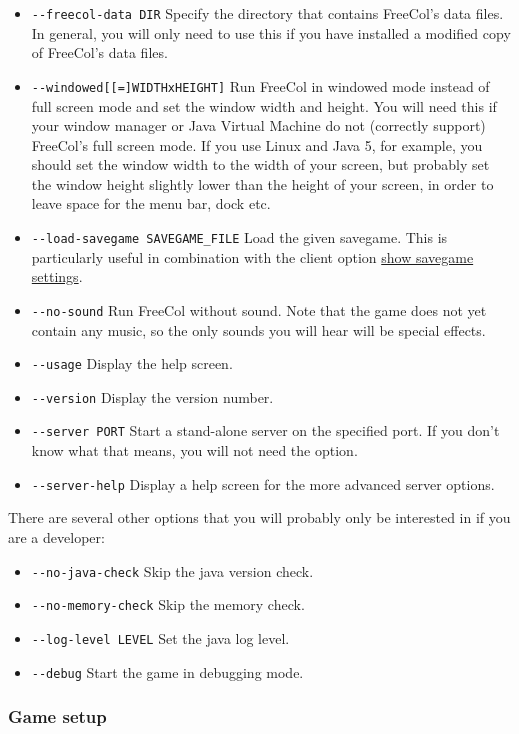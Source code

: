 \documentclass[12pt]{article}
\begin{document}
\begin{itemize}
\item\verb$--freecol-data DIR$ Specify the directory that contains
FreeCol's data files. In general, you will only need to use this if
you have installed a modified copy of FreeCol's data files.
\item\verb$--windowed[[=]WIDTHxHEIGHT]$ Run FreeCol in windowed mode
instead of full screen mode and set the window width and height. You
will need this if your window manager or Java Virtual Machine do not
(correctly support) FreeCol's full screen mode. If you use Linux and
Java 5, for example, you should set the window width to the width of
your screen, but probably set the window height slightly lower than
the height of your screen, in order to leave space for the menu bar,
dock etc.
\item\verb$--load-savegame SAVEGAME_FILE$ Load the given
savegame. This is particularly useful in combination with the client
option \hyperlink{show savegame settings}{show savegame settings}.
\item\verb$--no-sound$ Run FreeCol without sound. Note that the game
does not yet contain any music, so the only sounds you will hear will
be special effects.
\item\verb$--usage$ Display the help screen.
\item\verb$--version$ Display the version number.
\item\verb$--server PORT$ Start a stand-alone server on the specified
port. If you don't know what that means, you will not need the option.
\item\verb$--server-help$ Display a help screen for the more advanced
server options.
\end{itemize}

There are several other options that you will probably only be
interested in if you are a developer:

\begin{itemize}
\item\verb$--no-java-check$ Skip the java version check.
\item\verb$--no-memory-check$ Skip the memory check.
\item\verb$--log-level LEVEL$ Set the java log level.
\item\verb$--debug$ Start the game in debugging mode.
\end{itemize}


\hypertarget{Game setup}{\subsubsection{Game setup}}
\end{document}
